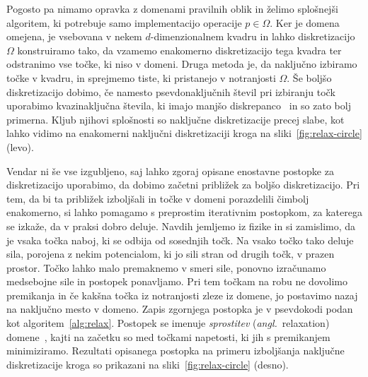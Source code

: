 \documentclass[12pt,a4paper,twoside]{article}
\theoremstyle{definition} %
\theoremstyle{plain} %
\numberwithin{equation}{section}
\newcommand{\ang}[1]{(\hspace{-1.5px}\textit{angl.}\ #1)}
\begin{document}
Pogosto pa nimamo opravka z domenami pravilnih oblik in želimo splošnejši algoritem, ki potrebuje
samo implementacijo operacije $p \in \Omega$. Ker je domena omejena, je vsebovana v nekem
$d$-dimenzionalnem kvadru in lahko diskretizacijo $\Omega$ konstruiramo tako, da vzamemo enakomerno
diskretizacijo tega kvadra ter odstranimo vse točke, ki niso v domeni. Druga metoda je, da
naključno izbiramo točke v kvadru, in sprejmemo tiste, ki pristanejo v notranjosti $\Omega$. Še
boljšo diskretizacijo dobimo, če namesto psevdonaključnih števil pri izbiranju točk
uporabimo kvazinaključna števila, ki imajo manjšo diskrepanco~\cite{morokoff1994quasi} in so zato
bolj primerna. Kljub njihovi splošnosti so naključne diskretizacije precej slabe, kot lahko vidimo
na enakomerni naključni diskretizaciji kroga na sliki~\ref{fig:relax-circle} (levo).

Vendar ni še vse izgubljeno, saj lahko zgoraj opisane enostavne postopke za diskretizacijo
uporabimo, da dobimo začetni približek za boljšo diskretizacijo. Pri tem, da bi ta približek
izboljšali in točke v domeni porazdelili čimbolj enakomerno, si lahko pomagamo s preprostim
iterativnim postopkom, za katerega se izkaže, da v praksi dobro deluje. Navdih jemljemo iz fizike in
si zamislimo, da je vsaka točka naboj, ki se odbija od sosednjih točk. Na vsako točko tako deluje
sila, porojena z nekim potencialom, ki jo sili stran od drugih točk, v prazen prostor. Točko lahko
malo premaknemo v smeri sile, ponovno izračunamo medsebojne sile in postopek ponavljamo. Pri tem
točkam na robu ne dovolimo premikanja in če kakšna točka iz notranjosti zleze iz domene, jo
postavimo nazaj na naključno mesto v domeno. Zapis zgornjega postopka je v psevdokodi podan kot
algoritem~\ref{alg:relax}. Postopek se imenuje \emph{sprostitev} \ang{relaxation}
domene~\cite[razdelek~2.2]{kosec2016local}, kajti na začetku so med točkami napetosti, ki jih s
premikanjem minimiziramo. Rezultati opisanega postopka na primeru izboljšanja naključne
diskretizacije kroga so prikazani na sliki~\ref{fig:relax-circle} (desno).
\end{document}
